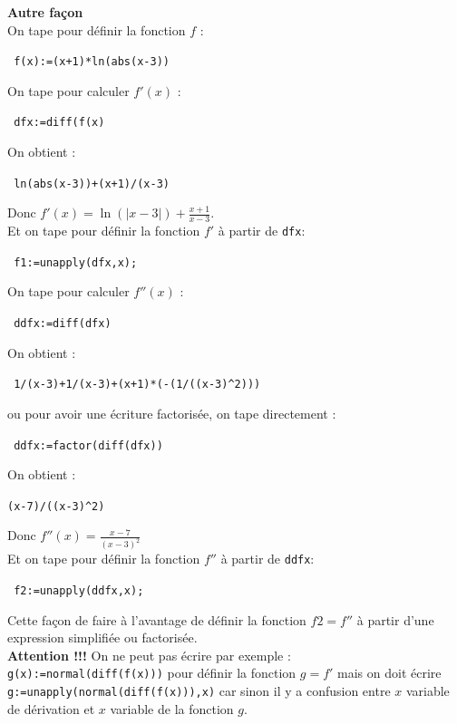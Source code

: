 \documentclass{article}
\begin{document}
\begin{enumerate}
{\bf Autre fa\c{c}on}\\
On tape pour d\'efinir la fonction $f$ :
\begin{center}
\verb| f(x):=(x+1)*ln(abs(x-3))|
\end{center}
On tape pour calculer $f'(x)$ :
\begin{center}
\verb| dfx:=diff(f(x)|
\end{center}
On obtient :
\begin{center}
\verb| ln(abs(x-3))+(x+1)/(x-3)|
\end{center}
Donc $\displaystyle f'(x)=\ln(|x-3|)+\frac{x+1}{x-3}$.\\
Et on tape pour d\'efinir la fonction $f'$ \`a partir de {\tt dfx}:
\begin{center}
\verb| f1:=unapply(dfx,x);|
\end{center}
On tape  pour calculer $f''(x)$ :
\begin{center}
\verb| ddfx:=diff(dfx)|
\end{center}
On obtient :
\begin{center}
\verb| 1/(x-3)+1/(x-3)+(x+1)*(-(1/((x-3)^2)))|
\end{center}
ou pour avoir une \'ecriture factoris\'ee, on tape directement :
\begin{center}
\verb| ddfx:=factor(diff(dfx))|
\end{center}
On obtient :
\begin{center}
\verb|(x-7)/((x-3)^2)|
\end{center}
Donc $\displaystyle f''(x)= \frac{x-7}{(x-3)^2}$\\
Et on tape pour d\'efinir la fonction $f''$ \`a partir de {\tt ddfx}:
\begin{center}
\verb| f2:=unapply(ddfx,x);|
\end{center}
Cette fa\c{c}on de faire \`a l'avantage de d\'efinir la fonction $f2=f''$ \`a 
partir d'une expression simplifi\'ee ou factoris\'ee.\\
{\bf Attention !!!} On ne peut pas \'ecrire par exemple :\\
{\tt g(x):=normal(diff(f(x)))} pour d\'efinir la fonction $g=f'$ mais on doit 
\'ecrire {\tt g:=unapply(normal(diff(f(x))),x)} car sinon il y a confusion 
entre $x$ variable de d\'erivation et $x$ variable de la fonction $g$.
 


\end{enumerate}
\end{document}
